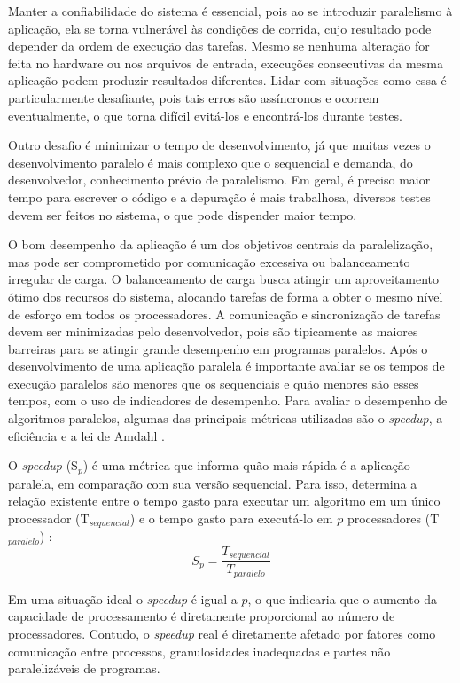 Manter a confiabilidade do sistema é essencial, pois ao se introduzir paralelismo à aplicação, ela se torna vulnerável às condições de corrida, cujo resultado pode depender da ordem de execução das tarefas. Mesmo se nenhuma alteração for feita no hardware ou nos arquivos de entrada, execuções consecutivas da mesma aplicação podem produzir resultados diferentes. Lidar com situações como essa é particularmente desafiante, pois tais erros são assíncronos e ocorrem eventualmente, o que torna difícil evitá-los e encontrá-los durante testes.

Outro desafio é minimizar o tempo de desenvolvimento, já que muitas vezes o desenvolvimento paralelo é mais complexo que o sequencial e demanda, do desenvolvedor, conhecimento prévio de paralelismo. Em geral, é preciso maior tempo para escrever o código e a depuração é mais trabalhosa, 	diversos testes devem ser feitos no sistema, o que pode dispender maior tempo.

O bom desempenho da aplicação é um dos objetivos centrais da paralelização, mas pode ser comprometido por comunicação excessiva ou balanceamento irregular de carga. O balanceamento de carga busca atingir um aproveitamento ótimo dos recursos do sistema, alocando tarefas de forma a obter o mesmo nível de esforço em todos os processadores.  A comunicação e sincronização de tarefas devem ser minimizadas pelo desenvolvedor, pois são tipicamente as maiores barreiras para se atingir grande desempenho em programas paralelos.
Após o desenvolvimento de uma aplicação paralela é importante avaliar se os tempos de execução paralelos são menores que os sequenciais e quão menores são esses tempos, com o uso de indicadores de desempenho. Para avaliar o desempenho de algoritmos paralelos, algumas das principais métricas utilizadas são o \textit{speedup}, a eficiência e a lei de Amdahl \cite{Rauber:2010, Breshears:2009}.

O \textit{speedup} (S$_p$) é uma métrica que informa quão mais rápida é a aplicação paralela, em comparação com sua versão sequencial. Para isso, determina a relação existente entre o tempo gasto para executar um algoritmo  em um único processador (T$_{sequencial}$) e o tempo gasto para executá-lo em $p$ processadores (T$_{paralelo}$) \cite{Rauber:2010}: 
\[ S_p = \frac{T_{sequencial}}{T_{paralelo}} \]	

Em uma situação ideal o \textit{speedup} é igual a $p$, o que indicaria que o aumento da capacidade de processamento é diretamente proporcional ao número de processadores. 
Contudo,  o \textit{speedup} real é diretamente afetado por fatores como comunicação entre processos, granulosidades inadequadas e partes não paralelizáveis de programas.


